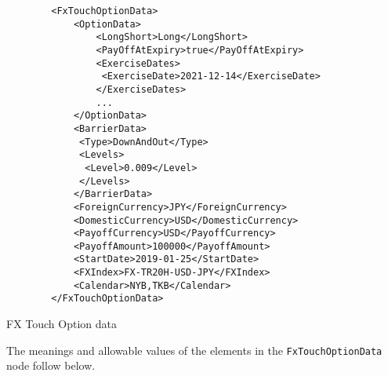 \begin{listing}[H]
\begin{verbatim}
        <FxTouchOptionData>
            <OptionData>
                <LongShort>Long</LongShort>
                <PayOffAtExpiry>true</PayOffAtExpiry>
                <ExerciseDates>
                 <ExerciseDate>2021-12-14</ExerciseDate>
                </ExerciseDates>
                ...                 
            </OptionData>
            <BarrierData>
             <Type>DownAndOut</Type>
             <Levels>
              <Level>0.009</Level>
             </Levels>
            </BarrierData>
            <ForeignCurrency>JPY</ForeignCurrency>
            <DomesticCurrency>USD</DomesticCurrency>
            <PayoffCurrency>USD</PayoffCurrency>
            <PayoffAmount>100000</PayoffAmount>            
            <StartDate>2019-01-25</StartDate>
            <FXIndex>FX-TR20H-USD-JPY</FXIndex>            
            <Calendar>NYB,TKB</Calendar>
        </FxTouchOptionData>
\end{verbatim}
\caption{FX Touch Option data}
\label{lst:fxtouchoption_data}
\end{listing}

The meanings and allowable values of the elements in the \lstinline!FxTouchOptionData!  node follow below.


